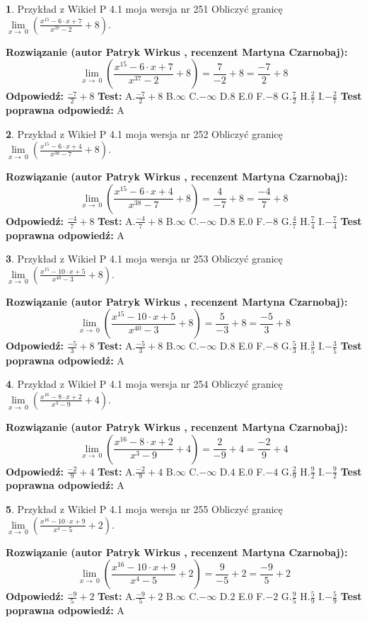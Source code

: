 \documentclass[12pt, a4paper]{article}
\theoremstyle{definition} %
\newtheorem{zad}{}
\newcommand{\zadStart}[1]{\begin{zad}#1\newline}
\newcommand{\zadStop}{\end{zad}}
\newcommand{\rozwStart}[2]{\noindent \textbf{Rozwiązanie (autor #1 , recenzent #2): }\newline}
\newcommand{\rozwStop}{\newline}
\newcommand{\odpStart}{\noindent \textbf{Odpowiedź:}\newline}
\newcommand{\odpStop}{\newline}
\newcommand{\testStart}{\noindent \textbf{Test:}\newline}
\newcommand{\testStop}{\newline}
\newcommand{\kluczStart}{\noindent \textbf{Test poprawna odpowiedź:}\newline}
\newcommand{\kluczStop}{\newline}
\begin{document}
\zadStart{Przykład z Wikieł P 4.1 moja wersja nr 251}
Obliczyć granicę $\lim\limits_{x\to\ 0}(\frac{x^{15}-6 \cdot x +7}{x^{37}-2}+8)$.
\zadStop
\rozwStart{Patryk Wirkus}{Martyna Czarnobaj}
$$\lim\limits_{x\to\ 0}(\frac{x^{15}-6 \cdot x +7}{x^{37}-2}+8)=\frac{7}{-2}+8=\frac{-7}{2}+8$$
\rozwStop
\odpStart
$\frac{-7}{2}+8$
\odpStop
\testStart
A.$\frac{-7}{2}+8$
B.$\infty$
C.$-\infty$
D.$8$
E.$0$
F.$-8$
G.$\frac{7}{2}$
H.$\frac{2}{7}$
I.$-\frac{2}{7}$
\testStop
\kluczStart
A
\kluczStop



\zadStart{Przykład z Wikieł P 4.1 moja wersja nr 252}
Obliczyć granicę $\lim\limits_{x\to\ 0}(\frac{x^{15}-6 \cdot x +4}{x^{38}-7}+8)$.
\zadStop
\rozwStart{Patryk Wirkus}{Martyna Czarnobaj}
$$\lim\limits_{x\to\ 0}(\frac{x^{15}-6 \cdot x +4}{x^{38}-7}+8)=\frac{4}{-7}+8=\frac{-4}{7}+8$$
\rozwStop
\odpStart
$\frac{-4}{7}+8$
\odpStop
\testStart
A.$\frac{-4}{7}+8$
B.$\infty$
C.$-\infty$
D.$8$
E.$0$
F.$-8$
G.$\frac{4}{7}$
H.$\frac{7}{4}$
I.$-\frac{7}{4}$
\testStop
\kluczStart
A
\kluczStop



\zadStart{Przykład z Wikieł P 4.1 moja wersja nr 253}
Obliczyć granicę $\lim\limits_{x\to\ 0}(\frac{x^{15}-10 \cdot x +5}{x^{40}-3}+8)$.
\zadStop
\rozwStart{Patryk Wirkus}{Martyna Czarnobaj}
$$\lim\limits_{x\to\ 0}(\frac{x^{15}-10 \cdot x +5}{x^{40}-3}+8)=\frac{5}{-3}+8=\frac{-5}{3}+8$$
\rozwStop
\odpStart
$\frac{-5}{3}+8$
\odpStop
\testStart
A.$\frac{-5}{3}+8$
B.$\infty$
C.$-\infty$
D.$8$
E.$0$
F.$-8$
G.$\frac{5}{3}$
H.$\frac{3}{5}$
I.$-\frac{3}{5}$
\testStop
\kluczStart
A
\kluczStop



\zadStart{Przykład z Wikieł P 4.1 moja wersja nr 254}
Obliczyć granicę $\lim\limits_{x\to\ 0}(\frac{x^{16}-8 \cdot x +2}{x^{3}-9}+4)$.
\zadStop
\rozwStart{Patryk Wirkus}{Martyna Czarnobaj}
$$\lim\limits_{x\to\ 0}(\frac{x^{16}-8 \cdot x +2}{x^{3}-9}+4)=\frac{2}{-9}+4=\frac{-2}{9}+4$$
\rozwStop
\odpStart
$\frac{-2}{9}+4$
\odpStop
\testStart
A.$\frac{-2}{9}+4$
B.$\infty$
C.$-\infty$
D.$4$
E.$0$
F.$-4$
G.$\frac{2}{9}$
H.$\frac{9}{2}$
I.$-\frac{9}{2}$
\testStop
\kluczStart
A
\kluczStop



\zadStart{Przykład z Wikieł P 4.1 moja wersja nr 255}
Obliczyć granicę $\lim\limits_{x\to\ 0}(\frac{x^{16}-10 \cdot x +9}{x^{4}-5}+2)$.
\zadStop
\rozwStart{Patryk Wirkus}{Martyna Czarnobaj}
$$\lim\limits_{x\to\ 0}(\frac{x^{16}-10 \cdot x +9}{x^{4}-5}+2)=\frac{9}{-5}+2=\frac{-9}{5}+2$$
\rozwStop
\odpStart
$\frac{-9}{5}+2$
\odpStop
\testStart
A.$\frac{-9}{5}+2$
B.$\infty$
C.$-\infty$
D.$2$
E.$0$
F.$-2$
G.$\frac{9}{5}$
H.$\frac{5}{9}$
I.$-\frac{5}{9}$
\testStop
\kluczStart
A
\kluczStop
\end{document}
